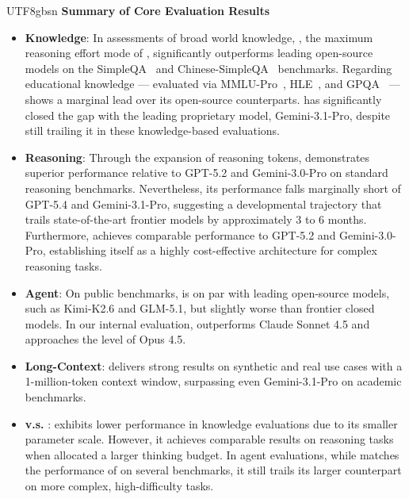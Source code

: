 \begin{CJK*}{UTF8}{gbsn}
\noindent
\textbf{Summary of Core Evaluation Results}
\begin{itemize}[topsep=0pt]
    \item \textbf{Knowledge}:
    In assessments of broad world knowledge, \dsvivpm{}, the maximum reasoning effort mode of \dsvivp{}, significantly outperforms leading open-source models on the SimpleQA~\citep{simpleqa} and Chinese-SimpleQA~\citep{csimpleqa} benchmarks. 
    Regarding educational knowledge --- evaluated via MMLU-Pro~\citep{mmlu_pro}, HLE~\citep{hle}, and GPQA~\citep{gpqa} --- \dsvivpm{} shows a marginal lead over its open-source counterparts. 
    \dsvivpm{} has significantly closed the gap with the leading proprietary model, Gemini-3.1-Pro, despite still trailing it in these knowledge-based evaluations.
    
    \item \textbf{Reasoning}: 
    Through the expansion of reasoning tokens, \dsvivpm{} demonstrates superior performance relative to GPT-5.2 and Gemini-3.0-Pro on standard reasoning benchmarks. 
    Nevertheless, its performance falls marginally short of GPT-5.4 and Gemini-3.1-Pro, suggesting a developmental trajectory that trails state-of-the-art frontier models by approximately 3 to 6 months.
    Furthermore, \dsvivfm{} achieves comparable performance to GPT-5.2 and Gemini-3.0-Pro, establishing itself as a highly cost-effective architecture for complex reasoning tasks.

    \item \textbf{Agent}: 
    On public benchmarks, \dsvivpm{} is on par with leading open-source models, such as Kimi-K2.6 and GLM-5.1, but slightly worse than frontier closed models. 
    In our internal evaluation, \dsvivpm{} outperforms Claude Sonnet 4.5 and approaches the level of Opus 4.5. 

    \item \textbf{Long-Context}: \dsvivpm{} delivers strong results on synthetic and real use cases with a 1-million-token context window, surpassing even Gemini-3.1-Pro on academic benchmarks.

    \item \textbf{\dsvivp{} v.s. \dsvivf{}}: 
    \dsvivfm{} exhibits lower performance in knowledge evaluations due to its smaller parameter scale. 
    However, it achieves comparable results on reasoning tasks when allocated a larger thinking budget. 
    In agent evaluations, while \dsvivfm{} matches the performance of \dsvivpm{} on several benchmarks, it still trails its larger counterpart on more complex, high-difficulty tasks.


\end{itemize}
\end{CJK*}

